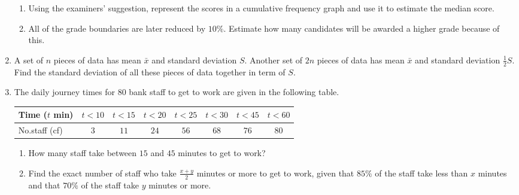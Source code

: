 \begin{enumerate}
\begin{enumerate}
	\item Using the examiners' suggestion, represent the scores in a cumulative frequency graph and use it to estimate the median score.
	\item All of the grade boundaries are later reduced by $10\%$. Estimate how many candidates will be awarded a higher grade because of this.
\end{enumerate}

\item A set of $n$ pieces of data has mean $\bar{x}$ and standard deviation $S$. Another set of $2n$ pieces of data has mean $\bar{x}$ and standard deviation $\frac{1}{2}S$. Find the standard deviation of all these pieces of data together in term of $S$.

\item The daily journey times for $80$ bank staff to get to work are given in the following table.

	 \medskip

\renewcommand{\arraystretch}{1.2} %
\begin{tabular}{|l|c|c|c|c|c|c|c|}
	\hline
	Time ($t$ min)  & $ t<10 $ & $ t<15 $ & $ t<20 $ & $ t<25$ & $ t<30 $  & $t<45$ & $t<60$  \\ 
	\hline
	No.staff (cf) & $3$ & $11$ & $24$ & $56$ & $68$ & $76$  &  $80$ \\ 
	\hline
\end{tabular}

\medskip

\begin{enumerate}
	\item How many staff take between $15$  and $45$ minutes to get to work?
	\item Find the exact number of staff who take $\frac{x+y}{2}$ minutes or more to get to work, given that $85\%$ of the staff take less than $x$ minutes and that $70\%$ of the staff take $y$ minutes or more.
\end{enumerate}



\end{enumerate}










\newpage 
\exam

